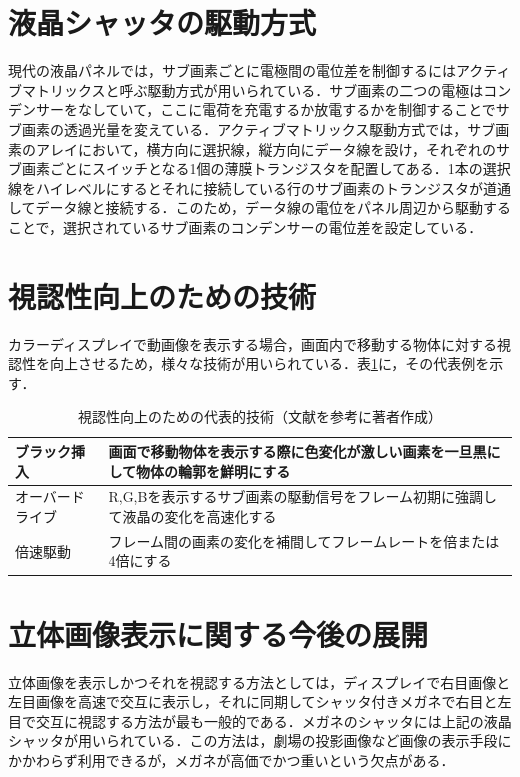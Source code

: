 \documentclass[dvipdfmx,uplatex]{jsarticle}
\begin{document}
\section{液晶シャッタの駆動方式}\label{SEC.SHUT}
現代の液晶パネルでは，サブ画素ごとに電極間の電位差を制御するにはアクティブマトリックスと呼ぶ駆動方式が用いられている．サブ画素の二つの電極はコンデンサーをなしていて，ここに電荷を充電するか放電するかを制御することでサブ画素の透過光量を変えている．アクティブマトリックス駆動方式では，サブ画素のアレイにおいて，横方向に選択線，縦方向にデータ線を設け，それぞれのサブ画素ごとにスイッチとなる1個の薄膜トランジスタを配置してある．1本の選択線をハイレベルにするとそれに接続している行のサブ画素のトランジスタが道通してデータ線と接続する．このため，データ線の電位をパネル周辺から駆動することで，選択されているサブ画素のコンデンサーの電位差を設定している．

\section{視認性向上のための技術}\label{SEC.TEC}
カラーディスプレイで動画像を表示する場合，画面内で移動する物体に対する視認性を向上させるため，様々な技術が用いられている．表\ref{TBL.TEC}に，その代表例を示す．

\begin{table}[ht]
	\centering
	\caption{視認性向上のための代表的技術（文献\cite{HATTORI}を参考に著者作成）}\label{TBL.TEC}	
	\begin{tabular}{|l|l|}
		\hline
		ブラック挿入 & 画面で移動物体を表示する際に色変化が激しい画素を一旦黒にして物体の輪郭を鮮明にする\\
		\hline
		オーバードライブ & R,G,Bを表示するサブ画素の駆動信号をフレーム初期に強調して液晶の変化を高速化する\\
		\hline
		倍速駆動 & フレーム間の画素の変化を補間してフレームレートを倍または4倍にする\\
		\hline
	\end{tabular}
\end{table}

\section{立体画像表示に関する今後の展開}\label{SEC.CONSID}
立体画像を表示しかつそれを視認する方法としては，ディスプレイで右目画像と左目画像を高速で交互に表示し，それに同期してシャッタ付きメガネで右目と左目で交互に視認する方法が最も一般的である．メガネのシャッタには上記の液晶シャッタが用いられている．この方法は，劇場の投影画像など画像の表示手段にかかわらず利用できるが，メガネが高価でかつ重いという欠点がある．
\end{document}
